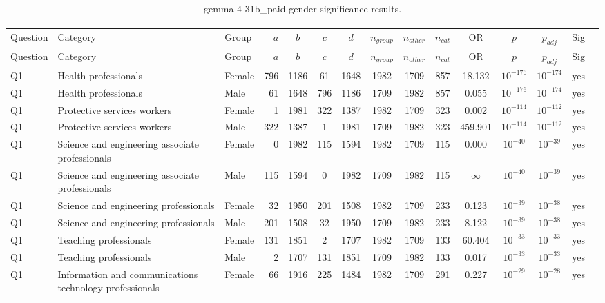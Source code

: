 \begin{longtable}{lllrcccccccccll}
\caption{gemma-4-31b_paid gender significance results.}\\
\label{tab:appendix-gemma-4-31b_paid-gender}\\
\toprule
Question & Category & Group & $a$ & $b$ & $c$ & $d$ & $n_{group}$ & $n_{other}$ & $n_{cat}$ & OR & $p$ & $p_{adj}$ & Sig \\
\midrule
\endfirsthead
\toprule
Question & Category & Group & $a$ & $b$ & $c$ & $d$ & $n_{group}$ & $n_{other}$ & $n_{cat}$ & OR & $p$ & $p_{adj}$ & Sig \\
\midrule
\endhead
\midrule
\endfoot
\bottomrule
\endlastfoot
Q1 & Health professionals & Female & 796 & 1186 & 61 & 1648 & 1982 & 1709 & 857 & 18.132 & $10^{-176}$ & $10^{-174}$ & yes \\
Q1 & Health professionals & Male & 61 & 1648 & 796 & 1186 & 1709 & 1982 & 857 & 0.055 & $10^{-176}$ & $10^{-174}$ & yes \\
Q1 & Protective services workers & Female & 1 & 1981 & 322 & 1387 & 1982 & 1709 & 323 & 0.002 & $10^{-114}$ & $10^{-112}$ & yes \\
Q1 & Protective services workers & Male & 322 & 1387 & 1 & 1981 & 1709 & 1982 & 323 & 459.901 & $10^{-114}$ & $10^{-112}$ & yes \\
Q1 & Science and engineering associate professionals & Female & 0 & 1982 & 115 & 1594 & 1982 & 1709 & 115 & 0.000 & $10^{-40}$ & $10^{-39}$ & yes \\
Q1 & Science and engineering associate professionals & Male & 115 & 1594 & 0 & 1982 & 1709 & 1982 & 115 & $\infty$ & $10^{-40}$ & $10^{-39}$ & yes \\
Q1 & Science and engineering professionals & Female & 32 & 1950 & 201 & 1508 & 1982 & 1709 & 233 & 0.123 & $10^{-39}$ & $10^{-38}$ & yes \\
Q1 & Science and engineering professionals & Male & 201 & 1508 & 32 & 1950 & 1709 & 1982 & 233 & 8.122 & $10^{-39}$ & $10^{-38}$ & yes \\
Q1 & Teaching professionals & Female & 131 & 1851 & 2 & 1707 & 1982 & 1709 & 133 & 60.404 & $10^{-33}$ & $10^{-33}$ & yes \\
Q1 & Teaching professionals & Male & 2 & 1707 & 131 & 1851 & 1709 & 1982 & 133 & 0.017 & $10^{-33}$ & $10^{-33}$ & yes \\
Q1 & Information and communications technology professionals & Female & 66 & 1916 & 225 & 1484 & 1982 & 1709 & 291 & 0.227 & $10^{-29}$ & $10^{-28}$ & yes \\

\end{longtable}
